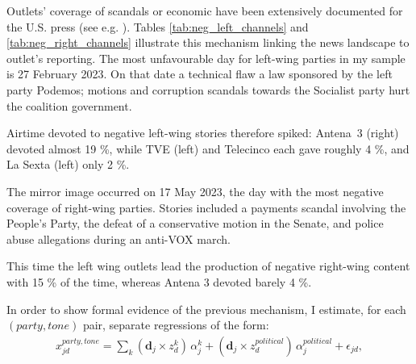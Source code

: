 \documentclass[12pt]{article}
\begin{document}

Outlets' coverage of scandals or economic  have been extensively documented for the U.S. press  (see e.g. \cite{puglisi2011newspapers, Larcinese2007NBERWP}). Tables \ref{tab:neg_left_channels} and \ref{tab:neg_right_channels} illustrate this mechanism linking the news landscape to outlet's reporting. 
The most unfavourable day for left-wing parties in my sample is 27 February 2023.  
On that date a technical flaw a law sponsored by the left party Podemos; motions and corruption scandals towards the Socialist party hurt the coalition government. 

Airtime devoted to negative left-wing stories therefore spiked: Antena~3 (right) devoted almost 19 \%, while TVE (left) and Telecinco each gave roughly 4 \%, and La Sexta (left) only 2 \%.

The mirror image occurred on 17 May 2023, the day with the most negative coverage of right-wing parties.  
Stories included a payments scandal involving the People's Party, the defeat of a conservative motion in the Senate, and police abuse allegations during an anti-VOX march.  

This time the left wing outlets lead the production of negative right-wing content with 15 \% of the time, whereas Antena 3 devoted barely 4 \%. 


\medskip

In order to show formal evidence of the previous mechanism,  I estimate, for each $(party,tone)$ pair, separate regressions of the form:
\begin{equation}\label{eq:pred_pos}
	\begin{aligned}
		 x^{party, tone}_{jd} =	\sum_{k} 
		\left(\bm d_j \times z^{k}_d\right)\,\alpha_{j}^{k}
		+
		\left(\bm d_j \times z^{political}_d\right)\,\alpha_j^{political}
		+ \epsilon_{jd},
	\end{aligned}
\end{equation}
\end{document}
